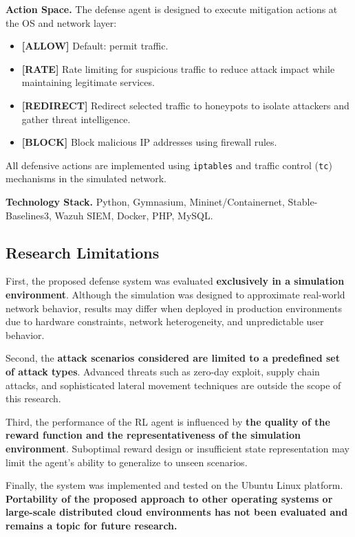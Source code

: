 \documentclass[12pt,a4paper]{report}
\begin{document}
\textbf{Action Space.} The defense agent is designed to execute mitigation actions at the OS and network layer:
\begin{itemize}
  \item \textbf{[ALLOW]} Default: permit traffic.
  \item \textbf{[RATE]} Rate limiting for suspicious traffic to reduce attack impact while maintaining legitimate services.
  \item \textbf{[REDIRECT]} Redirect selected traffic to honeypots to isolate attackers and gather threat intelligence.
  \item \textbf{[BLOCK]} Block malicious IP addresses using firewall rules.
\end{itemize}

All defensive actions are implemented using \texttt{iptables} and traffic control (\texttt{tc}) mechanisms in the simulated network.

\textbf{Technology Stack.} Python, Gymnasium, Mininet/Containernet, Stable-Baselines3, Wazuh SIEM, Docker, PHP, MySQL.

\subsection{Research Limitations}

First, the proposed defense system was evaluated \textbf{exclusively in a simulation environment}. Although the simulation was designed to approximate real-world network behavior, results may differ when deployed in production environments due to hardware constraints, network heterogeneity, and unpredictable user behavior.

Second, the \textbf{attack scenarios considered are limited to a predefined set of attack types}. Advanced threats such as zero-day exploit, supply chain attacks, and sophisticated lateral movement techniques are outside the scope of this research.

Third, the performance of the RL agent is influenced by \textbf{the quality of the reward function and the representativeness of the simulation environment}. Suboptimal reward design or insufficient state representation may limit the agent's ability to generalize to unseen scenarios.

Finally, the system was implemented and tested on the Ubuntu Linux platform. \textbf{Portability of the proposed approach to other operating systems or large-scale distributed cloud environments has not been evaluated and remains a topic for future research.}
\end{document}
